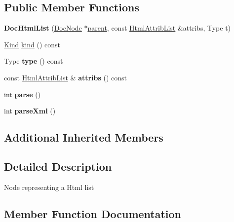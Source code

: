 \subsection*{Public Member Functions}
\begin{DoxyCompactItemize}
\item 
\mbox{\label{class_doc_html_list_a04842710c85b95fdd3cd5edf8666c74c}} 
{\bfseries Doc\+Html\+List} (\mbox{\hyperlink{class_doc_node}{Doc\+Node}} $\ast$\mbox{\hyperlink{class_doc_node_a73e8ad29a91cfceb0968eb00db71a23d}{parent}}, const \mbox{\hyperlink{class_html_attrib_list}{Html\+Attrib\+List}} \&attribs, Type t)
\item 
\mbox{\hyperlink{class_doc_node_aebd16e89ca590d84cbd40543ea5faadb}{Kind}} \mbox{\hyperlink{class_doc_html_list_a6a1d0b16331608ee83c5da4bd8bc2d4e}{kind}} () const
\item 
\mbox{\label{class_doc_html_list_ab92254aca59f20ebb04f85b0ffd92020}} 
Type {\bfseries type} () const
\item 
\mbox{\label{class_doc_html_list_a61362e1dee04a8229ed9620a99c5cd55}} 
const \mbox{\hyperlink{class_html_attrib_list}{Html\+Attrib\+List}} \& {\bfseries attribs} () const
\item 
\mbox{\label{class_doc_html_list_adc33f0929fe797f0a1b25263d27bd02a}} 
int {\bfseries parse} ()
\item 
\mbox{\label{class_doc_html_list_a4e520d50e258002fc3dc9996ff7cba1e}} 
int {\bfseries parse\+Xml} ()
\end{DoxyCompactItemize}
\subsection*{Additional Inherited Members}


\subsection{Detailed Description}
Node representing a Html list 

\subsection{Member Function Documentation}
\mbox{\label{class_doc_html_list_a6a1d0b16331608ee83c5da4bd8bc2d4e}} 
